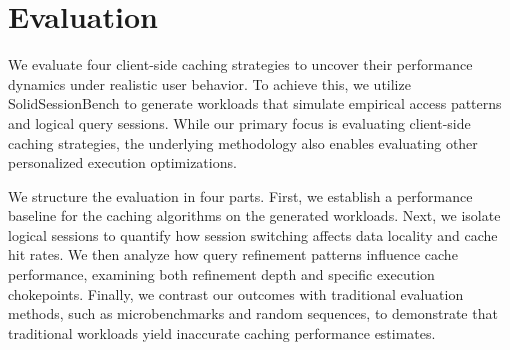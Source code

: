 \section{Evaluation}
\label{sec:evaluation}

We evaluate four client-side caching strategies to uncover their performance dynamics under realistic user behavior. 
To achieve this, we utilize SolidSessionBench to generate workloads that simulate empirical access patterns and logical query sessions. 
While our primary focus is evaluating client-side caching strategies, 
the underlying methodology also enables evaluating other personalized execution optimizations.

We structure the evaluation in four parts. 
First, we establish a performance baseline for the caching algorithms on the generated workloads. 
Next, we isolate logical sessions to quantify how session switching affects data locality and cache hit rates. 
We then analyze how query refinement patterns influence cache performance, 
examining both refinement depth and specific execution chokepoints. 
Finally, we contrast our outcomes with traditional evaluation methods, such as microbenchmarks and random sequences, to demonstrate that traditional workloads yield inaccurate caching performance estimates.



